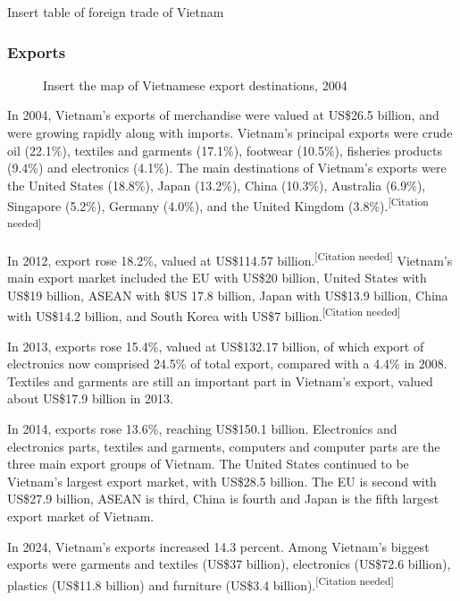 \documentclass{article}
\begin{document}
\begin{table}[h]
    \centering
    Insert table of foreign trade of Vietnam
\end{table}

\subsubsection*{Exports}

\begin{figure}
    \begin{framed}
    Insert the map of Vietnamese export destinations, 2004
    \end{framed}
\end{figure}

In 2004, Vietnam's exports of merchandise were valued at US\$26.5 billion, and were growing rapidly along with imports. Vietnam's principal exports were crude oil (22.1\%), textiles and garments (17.1\%), footwear (10.5\%), fisheries products (9.4\%) and electronics (4.1\%). The main destinations of Vietnam's exports were the United States (18.8\%), Japan (13.2\%), China (10.3\%), Australia (6.9\%), Singapore (5.2\%), Germany (4.0\%), and the United Kingdom (3.8\%).\textsuperscript{[Citation needed]}

In 2012, export rose 18.2\%, valued at US\$114.57 billion.\textsuperscript{[Citation needed]} Vietnam's main export market included the EU with US\$20 billion, United States with US\$19 billion, ASEAN with \$US 17.8 billion, Japan with US\$13.9 billion, China with US\$14.2 billion, and South Korea with US\$7 billion.\textsuperscript{[Citation needed]}

In 2013, exports rose 15.4\%, valued at US\$132.17 billion, of which export of electronics now comprised 24.5\% of total export, compared with a 4.4\% in 2008. Textiles and garments are still an important part in Vietnam's export, valued about US\$17.9 billion in 2013.

In 2014, exports rose 13.6\%, reaching US\$150.1 billion. Electronics and electronics parts, textiles and garments, computers and computer parts are the three main export groups of Vietnam. The United States continued to be Vietnam's largest export market, with US\$28.5 billion. The EU is second with US\$27.9 billion, ASEAN is third, China is fourth and Japan is the fifth largest export market of Vietnam.

In 2024, Vietnam's exports increased 14.3 percent. Among Vietnam's biggest exports were garments and textiles (US\$37 billion), electronics (US\$72.6 billion), plastics (US\$11.8 billion) and furniture (US\$3.4 billion).\textsuperscript{[Citation needed]}
\end{document}
